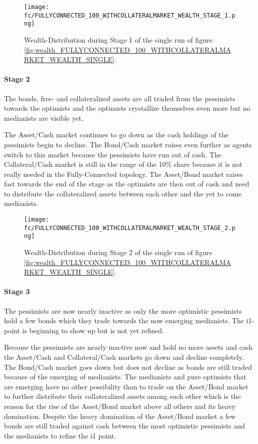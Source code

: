 \documentclass[Bachelorarbeit.tex]{subfiles}
\begin{document}
\begin{figure}[H]
	\centering
  \texttt{[image: fc/FULLYCONNECTED\_100\_WITHCOLLATERALMARKET\_WEALTH\_STAGE\_1.png]}
  	\caption{Wealth-Distribution during Stage 1 of the single run of figure \ref{fig:wealth_FULLYCONNECTED_100_WITHCOLLATERALMARKET_WEALTH_SINGLE}.}
	\label{fig:markets_FULLYCONNECTED_100_WITHCOLLATERALMARKET_WEALTH_STAGE_1}
\end{figure}

\paragraph{Stage 2}
The bonds, free- and collateralized assets are all traded from the pessimists towards the optimists and the optimists crystallize themselves even more but no medianists are visible yet.

\medskip

The Asset/Cash market continues to go down as the cash holdings of the pessimists begin to decline. The Bond/Cash market raises even further as agents switch to this market because the pessimists have run out of cash. The Collateral/Cash market is still in the range of the 10\% share because it is not really needed in the Fully-Connected topology. The Asset/Bond market raises fast towards the end of the stage as the optimists are then out of cash and need to distribute the collateralized assets between each other and the yet to come medianists.

\begin{figure}[H]
	\centering
  \texttt{[image: fc/FULLYCONNECTED\_100\_WITHCOLLATERALMARKET\_WEALTH\_STAGE\_2.png]}
  	\caption{Wealth-Distribution during Stage 2 of the single run of figure \ref{fig:wealth_FULLYCONNECTED_100_WITHCOLLATERALMARKET_WEALTH_SINGLE}.}
	\label{fig:markets_FULLYCONNECTED_100_WITHCOLLATERALMARKET_WEALTH_STAGE_2}
\end{figure}

\paragraph{Stage 3}
The pessimists are now nearly inactive as only the more optimistic pessimists hold a few bonds which they trade towards the now emerging medianists. The i1-point is beginning to show up but is not yet refined. 

\medskip

Because the pessimists are nearly inactive now and hold no more assets and cash the Asset/Cash and Collateral/Cash markets go down and decline completely. The Bond/Cash market goes down but does not decline as bonds are still traded because of the emerging of medianists. The medianists and pure optimists that are emerging have no other possibility than to trade on the Asset/Bond market to further distribute their collateralized assets among each other which is the reason for the rise of the Asset/Bond market above all others and its heavy domination. Despite the heavy domination of the Asset/Bond market a few bonds are still traded against cash between the most optimistic pessimists and the medianists to refine the i1 point.
\end{document}
